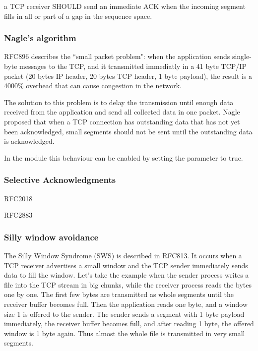 a TCP receiver SHOULD send an immediate ACK
when the incoming segment fills in all or part of a gap in the
sequence space.

\subsubsection*{Nagle's algorithm}

RFC896 describes the ``small packet problem": when the application
sends single-byte messages to the TCP, and it transmitted immediatly
in a 41 byte TCP/IP packet (20 bytes IP header, 20 bytes TCP header,
1 byte payload), the result is a 4000\% overhead that can cause
congestion in the network.

The solution to this problem is to delay the transmission until
enough data received from the application and send all collected
data in one packet. Nagle proposed that
when a TCP connection has outstanding data that has not
yet been acknowledged, small segments should not be sent
until the outstanding data is acknowledged.

In the  module this behaviour can be enabled
by setting the  parameter to true.

\subsubsection*{Selective Acknowledgments}

RFC2018

RFC2883

\subsubsection*{Silly window avoidance}

The Silly Window Syndrome (SWS) is described in RFC813. It occurs when
a TCP receiver advertises a small window and the TCP sender immediately
sends data to fill the window. Let's take the example when the sender
process writes a file into the TCP stream in big chunks, while the
receiver process reads the bytes one by one. The first few bytes
are transmitted as whole segments until the receiver buffer
becomes full. Then the application reads one
byte, and a window size 1 is offered to the sender. The sender sends
a segment with 1 byte payload immediately, the receiver buffer becomes
full, and after reading 1 byte, the offered window is 1 byte again.
Thus almost the whole file is transmitted in very small segments.

